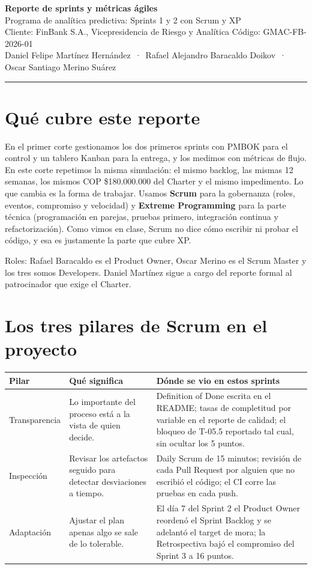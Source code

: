 \documentclass[10pt,a4paper]{article}
\begin{document}
\begin{center}
{\Large\bfseries Reporte de sprints y métricas ágiles}\\[2pt]
Programa de analítica predictiva: Sprints 1 y 2 con Scrum y XP\\[2pt]
{\small Cliente: FinBank S.A., Vicepresidencia de Riesgo y Analítica \quad Código: GMAC-FB-2026-01}\\
{\small Daniel Felipe Martínez Hernández \,·\, Rafael Alejandro Baracaldo Doikov \,·\, Oscar Santiago Merino Suárez}
\end{center}
\vspace{-6pt}\rule{\linewidth}{0.4pt}

\section{Qué cubre este reporte}
En el primer corte gestionamos los dos primeros sprints con PMBOK para el control y un tablero Kanban para la
entrega, y los medimos con métricas de flujo. En este corte repetimos la misma simulación: el mismo backlog, las
mismas 12 semanas, los mismos COP \$180.000.000 del Charter y el mismo impedimento. Lo que cambia es la forma de
trabajar. Usamos \textbf{Scrum} para la gobernanza (roles, eventos, compromiso y velocidad) y
\textbf{Extreme Programming} para la parte técnica (programación en parejas, pruebas primero, integración continua
y refactorización). Como vimos en clase, Scrum no dice cómo escribir ni probar el código, y esa es justamente la
parte que cubre XP.

Roles: Rafael Baracaldo es el Product Owner, Oscar Merino es el Scrum Master y los tres somos Developers. Daniel
Martínez sigue a cargo del reporte formal al patrocinador que exige el Charter.

\section{Los tres pilares de Scrum en el proyecto}
{\footnotesize
\begin{tabularx}{\linewidth}{@{}p{2.2cm} L L@{}}
\toprule
Pilar & Qué significa & Dónde se vio en estos sprints \\
\midrule
Transparencia & Lo importante del proceso está a la vista de quien decide. & Definition of Done escrita en el README; tasas de completitud por variable en el reporte de calidad; el bloqueo de T-05.5 reportado tal cual, sin ocultar los 5 puntos. \\
Inspección & Revisar los artefactos seguido para detectar desviaciones a tiempo. & Daily Scrum de 15 minutos; revisión de cada Pull Request por alguien que no escribió el código; el CI corre las pruebas en cada push. \\
Adaptación & Ajustar el plan apenas algo se sale de lo tolerable. & El día 7 del Sprint 2 el Product Owner reordenó el Sprint Backlog y se adelantó el target de mora; la Retrospectiva bajó el compromiso del Sprint 3 a 16 puntos. \\
\bottomrule
\end{tabularx}}
\end{document}
